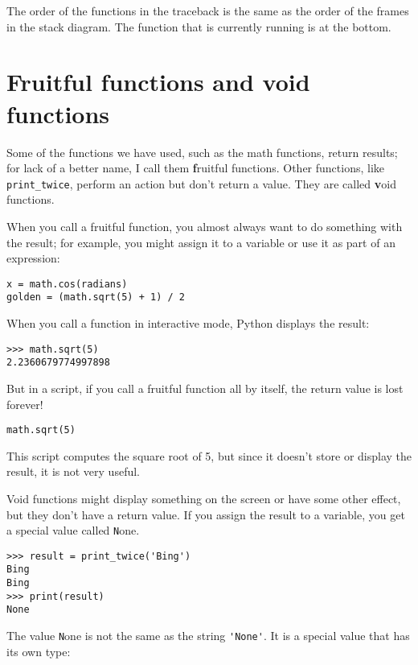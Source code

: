 \documentclass[
DIV=11,
fontsize=13,
twoside,
headinclude=false,
titlepage=firstiscover,
abstract=true,
headsepline=true,
footsepline=true,
chapterprefix=true, %
headings=big,
bibliography=totoc,%
captions=tableheading
]{scrbook}
\theoremstyle{definition}
\begin{document}
The order of the functions in the traceback is the same as the
order of the frames in the stack diagram.  The function that is
currently running is at the bottom.


\section{Fruitful functions and void functions}

Some of the functions we have used, such as the math functions, return
results; for lack of a better name, I call them {\textbf fruitful
  functions}.  Other functions, like \verb"print_twice", perform an
action but don't return a value.  They are called {\textbf void
  functions}.

When you call a fruitful function, you almost always
want to do something with the result; for example, you might
assign it to a variable or use it as part of an expression:

\begin{lstlisting}
x = math.cos(radians)
golden = (math.sqrt(5) + 1) / 2
\end{lstlisting}
%
When you call a function in interactive mode, Python displays
the result:

\begin{lstlisting}
>>> math.sqrt(5)
2.2360679774997898
\end{lstlisting}
%
But in a script, if you call a fruitful function all by itself,
the return value is lost forever!

\begin{lstlisting}
math.sqrt(5)
\end{lstlisting}
%
This script computes the square root of 5, but since it doesn't store
or display the result, it is not very useful.

Void functions might display something on the screen or have some
other effect, but they don't have a return value.  If you
assign the result to a variable, you get a special value called
{\texttt None}.

\begin{lstlisting}
>>> result = print_twice('Bing')
Bing
Bing
>>> print(result)
None
\end{lstlisting}
%
The value {\texttt None} is not the same as the string \verb"'None'". 
It is a special value that has its own type:
\end{document}
